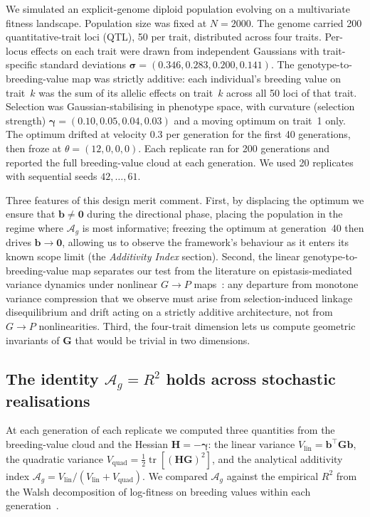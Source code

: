 \documentclass[9pt,twocolumn,twoside,lineno]{gsajnl}
\newcommand{\vect}[1]{\boldsymbol{#1}}
\newcommand{\mat}[1]{\mathbf{#1}}
\newcommand{\tr}{\ensuremath{\operatorname{tr}}\xspace}
\newcommand{\Ag}{\ensuremath{\mathcal{A}_{g}}\xspace}
\newcommand{\Vlin}{\ensuremath{V_{\text{lin}}}\xspace}
\newcommand{\Vquad}{\ensuremath{V_{\text{quad}}}\xspace}
\begin{document}
We simulated an explicit-genome diploid population evolving on a multivariate fitness landscape. Population size was fixed at $N=2000$. The genome carried 200 quantitative-trait loci (QTL), 50 per trait, distributed across four traits. Per-locus effects on each trait were drawn from independent Gaussians with trait-specific standard deviations $\bm{\sigma} = (0.346, 0.283, 0.200, 0.141)$. The genotype-to-breeding-value map was strictly additive: each individual's breeding value on trait~$k$ was the sum of its allelic effects on trait~$k$ across all 50 loci of that trait. Selection was Gaussian-stabilising in phenotype space, with curvature (selection strength) $\bm{\gamma} = (0.10, 0.05, 0.04, 0.03)$ and a moving optimum on trait~1 only. The optimum drifted at velocity $0.3$ per generation for the first 40 generations, then froze at $\theta = (12, 0, 0, 0)$. Each replicate ran for 200 generations and reported the full breeding-value cloud at each generation. We used 20 replicates with sequential seeds $42,\ldots,61$.

Three features of this design merit comment. First, by displacing the optimum we ensure that $\vect{b}\neq\vect{0}$ during the directional phase, placing the population in the regime where \Ag is most informative; freezing the optimum at generation~40 then drives $\vect{b}\to\vect{0}$, allowing us to observe the framework's behaviour as it enters its known scope limit (the \textit{Additivity Index} section). Second, the linear genotype-to-breeding-value map separates our test from the literature on epistasis-mediated variance dynamics under nonlinear $G\!\to\!P$ maps~\citep{CarterHermissonHansen2005,Hansen2013}: any departure from monotone variance compression that we observe must arise from selection-induced linkage disequilibrium and drift acting on a strictly additive architecture, not from $G\!\to\!P$ nonlinearities. Third, the four-trait dimension lets us compute geometric invariants of $\mat{G}$ that would be trivial in two dimensions.

\subsection*{The identity \texorpdfstring{$\Ag = R^2$}{Ag = R\textasciicircum 2} holds across stochastic realisations}

At each generation of each replicate we computed three quantities from the breeding-value cloud and the Hessian $\mat{H}=-\bm{\gamma}$: the linear variance $\Vlin = \vect{b}^{\top}\mat{G}\vect{b}$, the quadratic variance $\Vquad = \tfrac{1}{2}\tr[(\mat{H}\mat{G})^2]$, and the analytical additivity index $\Ag = \Vlin/(\Vlin+\Vquad)$. We compared \Ag against the empirical $R^2$ from the Walsh decomposition of log-fitness on breeding values within each generation~\citep{Walsh2018}.
\end{document}
